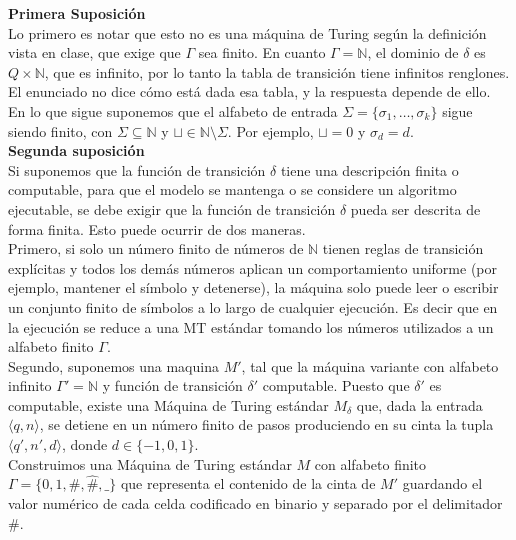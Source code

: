 \textbf{Primera Suposición}\\

Lo primero es notar que esto no es una máquina de Turing según la definición vista en clase, que exige que $\Gamma$ sea finito. En cuanto $\Gamma = \mathbb{N}$, el dominio de $\delta$ es $Q \times \mathbb{N}$, que es infinito, por lo tanto la tabla de transición tiene infinitos renglones. El enunciado no dice cómo está dada esa tabla, y la respuesta depende de ello.\\

En lo que sigue suponemos que el alfabeto de entrada $\Sigma = \{\sigma_1, \dots, \sigma_k\}$ sigue siendo finito, con $\Sigma \subseteq \mathbb{N}$ y $\sqcup \in \mathbb{N} \setminus \Sigma$. Por ejemplo, $\sqcup = 0$ y $\sigma_d = d$.\\

\textbf{Segunda suposición}\\

Si suponemos que la función de transición $\delta$ tiene una descripción finita o computable, para que el modelo se mantenga o se considere un algoritmo ejecutable, se debe exigir que la función de transición $\delta$ pueda ser descrita de forma finita. Esto puede ocurrir de dos maneras.\\

Primero, si solo un número finito de números de $\mathbb{N}$ tienen reglas de transición explícitas y todos los demás números aplican un comportamiento uniforme (por ejemplo, mantener el símbolo y detenerse), la máquina solo puede leer o escribir un conjunto finito de símbolos a lo largo de cualquier ejecución. Es decir que en la ejecución se reduce a una MT estándar tomando los números utilizados a un alfabeto finito $\Gamma$.\\

Segundo, suponemos una maquina $M'$, tal que la máquina variante con alfabeto infinito $\Gamma' = \mathbb{N}$ y función de transición $\delta'$ computable. Puesto que $\delta'$ es computable, existe una Máquina de Turing estándar $M_\delta$ que, dada la entrada $\langle q, n \rangle$, se detiene en un número finito de pasos produciendo en su cinta la tupla $\langle q', n', d \rangle$, donde $d \in \{-1, 0, 1\}$.\\

Construimos una Máquina de Turing estándar $M$ con alfabeto finito $\Gamma = \{0, 1, \#, \hat{\#}, \text{\_}\}$ que representa el contenido de la cinta de $M'$ guardando el valor numérico de cada celda codificado en binario y separado por el delimitador $\#$.\\

